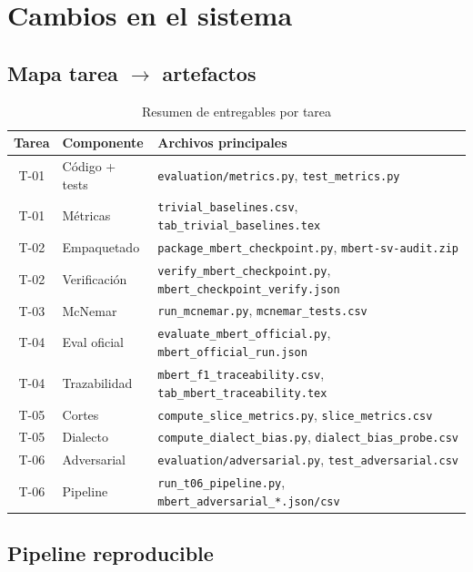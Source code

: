 \chapter{Cambios en el sistema}

\section{Mapa tarea $\rightarrow$ artefactos}

\begin{table}[H]
  \centering
  \caption{Resumen de entregables por tarea}
  \label{tab:deliverables}
  \small
  \begin{tabular}{clp{6.5cm}}
    \toprule
    Tarea & Componente & Archivos principales \\
    \midrule
    T-01 & Código + tests & \texttt{evaluation/metrics.py}, \texttt{test\_metrics.py} \\
    T-01 & Métricas & \texttt{trivial\_baselines.csv}, \texttt{tab\_trivial\_baselines.tex} \\
    T-02 & Empaquetado & \texttt{package\_mbert\_checkpoint.py}, \texttt{mbert-sv-audit.zip} \\
    T-02 & Verificación & \texttt{verify\_mbert\_checkpoint.py}, \texttt{mbert\_checkpoint\_verify.json} \\
    T-03 & McNemar & \texttt{run\_mcnemar.py}, \texttt{mcnemar\_tests.csv} \\
    T-04 & Eval oficial & \texttt{evaluate\_mbert\_official.py}, \texttt{mbert\_official\_run.json} \\
    T-04 & Trazabilidad & \texttt{mbert\_f1\_traceability.csv}, \texttt{tab\_mbert\_traceability.tex} \\
    T-05 & Cortes & \texttt{compute\_slice\_metrics.py}, \texttt{slice\_metrics.csv} \\
    T-05 & Dialecto & \texttt{compute\_dialect\_bias.py}, \texttt{dialect\_bias\_probe.csv} \\
    T-06 & Adversarial & \texttt{evaluation/adversarial.py}, \texttt{test\_adversarial.csv} \\
    T-06 & Pipeline & \texttt{run\_t06\_pipeline.py}, \texttt{mbert\_adversarial\_*.json/csv} \\
    \bottomrule
  \end{tabular}
\end{table}

\section{Pipeline reproducible}

